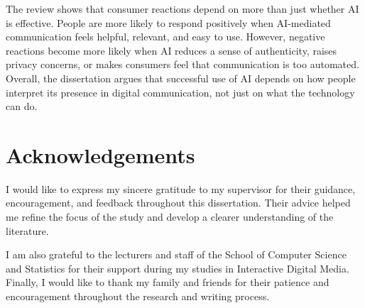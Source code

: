 \documentclass[a4paper,oneside,12pt]{book}
\numberwithin{equation}{chapter} %
\begin{document}
The review shows that consumer reactions depend on more than just whether AI is effective. People are more likely to respond positively when AI-mediated communication feels helpful, relevant, and easy to use. However, negative reactions become more likely when AI reduces a sense of authenticity, raises privacy concerns, or makes consumers feel that communication is too automated. Overall, the dissertation argues that successful use of AI depends on how people interpret its presence in digital communication, not just on what the technology can do.

\newpage
\onehalfspacing\raggedright %

\section*{\Huge\textcolor{tcd_blue}{Acknowledgements}}
I would like to express my sincere gratitude to my supervisor for their guidance, encouragement, and feedback throughout this dissertation. Their advice helped me refine the focus of the study and develop a clearer understanding of the literature.

I am also grateful to the lecturers and staff of the School of Computer Science and Statistics for their support during my studies in Interactive Digital Media. Finally, I would like to thank my family and friends for their patience and encouragement throughout the research and writing process.
\tableofcontents
\listoffigures
\listoftables

\mainmatter






%


\appendix
\renewcommand{\thechapter}{A\arabic{chapter}}

\end{document}
